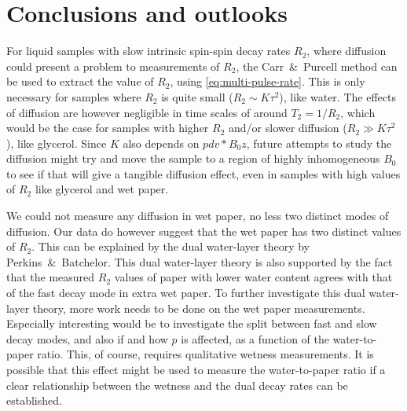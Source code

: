 \documentclass[11pt,a4paper, twocolumn,
swedish, english %
]{article}
\begin{document}



\section{Conclusions and outlooks}


For liquid samples with slow intrinsic spin-spin decay rates $R_2$,
where diffusion could present a problem to measurements of $R_2$, the
Carr~\&~Purcell method can be used to extract the value of
$R_2$, using \eqref{eq:multi-pulse-rate}. This is only necessary for
samples where $R_2$ is quite small ($R_2\sim K\tau^2$), like
water. The effects of diffusion are however negligible in time scales
of around $T_2=1/R_2$, which would be the case for samples with higher
$R_2$ and/or slower diffusion ($R_2\gg K\tau^2$), like glycerol. 
Since $K$ also depends on $pdv*{B_0}{z}$, future attempts to study the
diffusion might try and move the sample to a region of highly
inhomogeneous $B_0$ to see if that will give a tangible diffusion
effect, even in samples with high values of $R_2$ like glycerol and wet
paper. 

We could not measure any diffusion in wet paper, no less two distinct
modes of diffusion. Our data do however suggest that the wet paper
has two distinct values of $R_2$. This can be explained by the dual
water-layer theory by Perkins~\&~Batchelor. This dual water-layer
theory is also supported by the fact that the measured $R_2$ values
of paper with lower water content agrees with that of the fast decay
mode in extra wet paper. To further investigate this dual water-layer
theory, more work needs to be done on the wet paper
measurements. Especially interesting would be to investigate the split
between fast and slow decay modes, and also if and how $p$ is
affected, as a function of the water-to-paper ratio. This, of course,
requires qualitative wetness measurements. It is possible that this
effect might be used to measure the water-to-paper ratio if a clear
relationship between the wetness and the dual decay rates can be
established.
\end{document}
